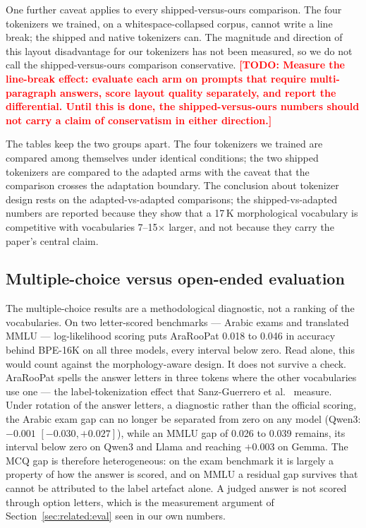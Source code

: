 \documentclass[a4paper,fleqn]{cas-sc}
\newcommand{\todo}[1]{\textcolor{red}{\textbf{[\textsc{TODO}: #1]}}}
\begin{document}
One further caveat applies to every shipped-versus-ours comparison. The four tokenizers we trained, on a whitespace-collapsed corpus, cannot write a line break; the shipped and native tokenizers can. The magnitude and direction of this layout disadvantage for our tokenizers has not been measured, so we do not call the shipped-versus-ours comparison conservative.
\todo{Measure the line-break effect: evaluate each arm on prompts that require multi-paragraph answers, score layout quality separately, and report the differential. Until this is done, the shipped-versus-ours numbers should not carry a claim of conservatism in either direction.}

The tables keep the two groups apart. The four tokenizers we trained are compared among themselves under identical conditions; the two shipped tokenizers are compared to the adapted arms with the caveat that the comparison crosses the adaptation boundary. The conclusion about tokenizer design rests on the adapted-vs-adapted comparisons; the shipped-vs-adapted numbers are reported because they show that a 17\,K morphological vocabulary is competitive with vocabularies 7--15$\times$ larger, and not because they carry the paper's central claim.

\subsection{Multiple-choice versus open-ended evaluation}
\label{sec:results:mcq}

The multiple-choice results are a methodological diagnostic, not a ranking of the vocabularies. On two letter-scored benchmarks --- Arabic exams and translated MMLU --- log-likelihood scoring puts AraRooPat 0.018 to 0.046 in accuracy behind BPE-16K on all three models, every interval below zero. Read alone, this would count against the morphology-aware design. It does not survive a check. AraRooPat spells the answer letters in three tokens where the other vocabularies use one --- the label-tokenization effect that Sanz-Guerrero et al.\ \citep{sanzguerrero2025mind} measure. Under rotation of the answer letters, a diagnostic rather than the official scoring, the Arabic exam gap can no longer be separated from zero on any model (Qwen3: $-0.001$ $[-0.030,+0.027]$), while an MMLU gap of 0.026 to 0.039 remains, its interval below zero on Qwen3 and Llama and reaching $+0.003$ on Gemma. The MCQ gap is therefore heterogeneous: on the exam benchmark it is largely a property of how the answer is scored, and on MMLU a residual gap survives that cannot be attributed to the label artefact alone. A judged answer is not scored through option letters, which is the measurement argument of Section~\ref{sec:related:eval} seen in our own numbers.
\end{document}
